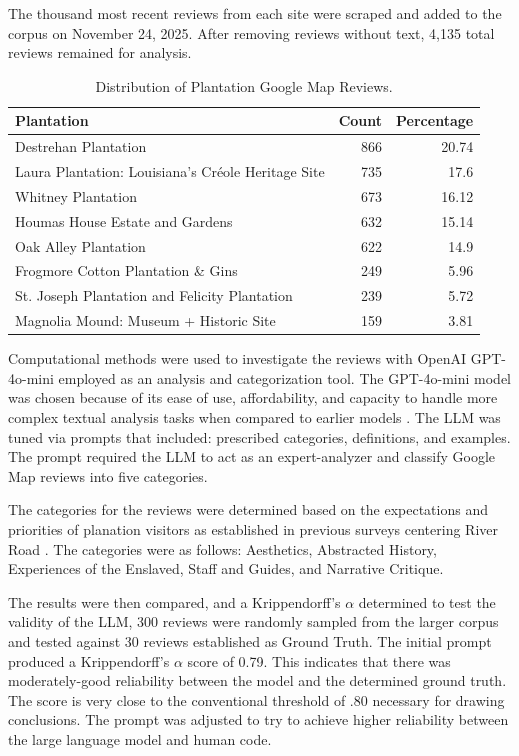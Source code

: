 \documentclass[final]{anthology-ch} %
\begin{document}
The thousand most recent reviews from each site were scraped and added to the corpus on November 24, 2025. After removing reviews without text, 4,135 total reviews remained for analysis.

\begin{table}[h]
  \centering
  \begin{tabular}{lrr}
    \toprule
    Plantation & Count & Percentage \\
    \midrule
    Destrehan Plantation & 866 & 20.74 \\
    Laura Plantation: Louisiana's Créole Heritage Site & 735 & 17.6 \\
    Whitney Plantation & 673 & 16.12 \\
    Houmas House Estate and Gardens & 632 & 15.14 \\
    Oak Alley Plantation & 622 & 14.9 \\
    Frogmore Cotton Plantation \& Gins & 249 & 5.96 \\
    St. Joseph Plantation and Felicity Plantation & 239 & 5.72 \\
    Magnolia Mound: Museum + Historic Site & 159 & 3.81 \\
    \bottomrule
  \end{tabular}
  \caption{Distribution of Plantation Google Map Reviews.}
  \label{tab:distribution}
\end{table}

Computational methods were used to investigate the reviews with OpenAI GPT-4o-mini employed as an analysis and categorization tool. The GPT-4o-mini model was chosen because of its ease of use, affordability, and capacity to handle more complex textual analysis tasks when compared to earlier models \cite{openaigpt4omini}. The LLM was tuned via prompts that included: prescribed categories, definitions, and examples. The prompt required the LLM to act as an expert-analyzer and classify Google Map reviews into five categories.

The categories for the reviews were determined based on the expectations and priorities of planation visitors as established in previous surveys centering River Road \cite{bright2016who}. The categories were as follows: Aesthetics, Abstracted History, Experiences of the Enslaved, Staff and Guides, and Narrative Critique.

The results were then compared, and a Krippendorff's $\alpha$ determined to test the validity of the LLM, 300 reviews were randomly sampled from the larger corpus and tested against 30 reviews established as Ground Truth. The initial prompt produced a Krippendorff's $\alpha$ score of 0.79. This indicates that there was moderately-good reliability between the model and the determined ground truth. The score is very close to the conventional threshold of .80 necessary for drawing conclusions. The prompt was adjusted to try to achieve higher reliability between the large language model and human code.
\end{document}
